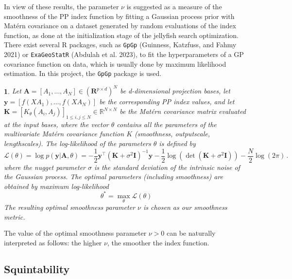\documentclass[
  12pt,
]{interact}
\theoremstyle{plain}
\newtheorem{defn}{\protect\definitionname}
\providecommand{\definitionname}{Definition}
\begin{document}
In view of these results, the parameter \(\nu\) is suggested as a
measure of the smoothness of the PP index function by fitting a Gaussian
process prior with Matérn covariance on a dataset generated by random
evaluations of the index function, as done at the initialization stage
of the jellyfish search optimization. There exist several R packages,
such as \texttt{GpGp} (Guinness, Katzfuss, and Fahmy 2021) or
\texttt{ExaGeoStatR} (Abdulah et al. 2023), to fit the hyperparameters
of a GP covariance function on data, which is usually done by maximum
likelihood estimation. In this project, the \texttt{GpGp} package is
used.

\begin{defn}
Let $\mathbf{A}=[A_1, \ldots, A_N] \in (\mathbf{R}^{p \times d})^N$ be d-dimensional projection bases, let $\mathbf{y}=[f(XA_1),\ldots,f(XA_N)]$ be the corresponding PP index values, and let $\mathbf{K}=[K_\theta(A_{i},A_{j})]_{1\leq i,j\leq N}\in\mathbb{R}^{N\times N}$ be the Matérn covariance matrix evaluated at the input bases, where the vector $\theta$ contains all the parameters of the multivariate Matérn covariance function $K$ (smoothness, outputscale, lengthscales). The log-likelihood of the parameters $\theta$ is defined by 
\begin{equation}
\mathcal{L}(\theta)=\log p(\mathbf{y}\left|\mathbf{A},\theta\right.)=-\frac{1}{2}\mathbf{y}^{\top}(\mathbf{K}+\sigma^{2}\mathbf{I})^{-1}\mathbf{y}-\frac{1}{2}\mathrm{\log}(\det(\mathbf{K}+\sigma^{2}\mathbf{I}))-\frac{N}{2}\log(2\pi)\,.\label{eq:gp_log_likelihood}
\end{equation}
where the nugget parameter $\sigma$ is the standard deviation of the intrinsic noise of the Gaussian process.
The optimal parameters (including smoothness) are obtained by maximum log-likelihood
\begin{equation}
\theta^* = \underset{\theta}{\max}\mathcal{L}(\theta)
\end{equation}
The resulting optimal smoothness parameter $\nu$ is chosen as our smoothness metric.
\end{defn}

The value of the optimal smoothness parameter \(\nu>0\) can be naturally
interpreted as follows: the higher \(\nu\), the smoother the index
function.

\hypertarget{sec-squintability}{%
\subsection{Squintability}\label{sec-squintability}}
\end{document}
